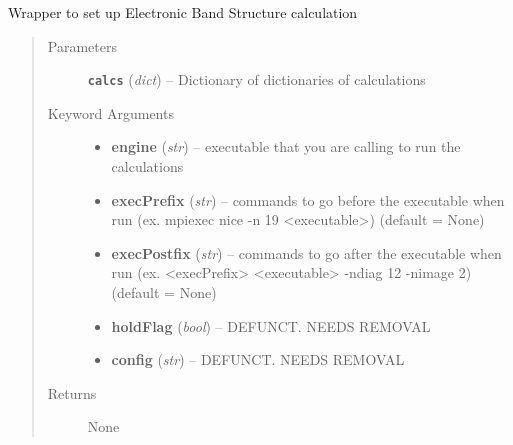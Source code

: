 \documentclass[letterpaper,10pt,english]{sphinxmanual}
\begin{document}
\begin{fulllineitems}
\label{run:run.bands}
Wrapper to set up Electronic Band Structure calculation
\begin{quote}\begin{description}
\item[{Parameters}] \leavevmode
\textbf{\texttt{calcs}} (\emph{dict}) -- Dictionary of dictionaries of calculations

\item[{Keyword Arguments}] \leavevmode\begin{itemize}
\item {} 
\textbf{engine} (\emph{str}) --
executable that you are calling to run the calculations

\item {} 
\textbf{execPrefix} (\emph{str}) --
commands to go before the executable when run
(ex. mpiexec nice -n 19 \textless{}executable\textgreater{}) (default = None)

\item {} 
\textbf{execPostfix} (\emph{str}) --
commands to go after the executable when run
(ex. \textless{}execPrefix\textgreater{} \textless{}executable\textgreater{} -ndiag 12 -nimage 2) (default = None)

\item {} 
\textbf{holdFlag} (\emph{bool}) --
DEFUNCT. NEEDS REMOVAL

\item {} 
\textbf{config} (\emph{str}) --
DEFUNCT. NEEDS REMOVAL

\end{itemize}

\item[{Returns}] \leavevmode
None

\end{description}\end{quote}

\end{fulllineitems}

\end{document}
